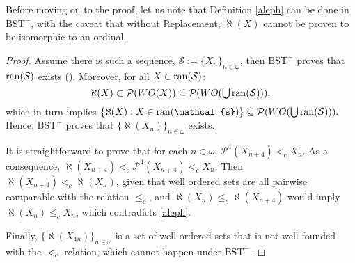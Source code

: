 \documentclass{article}
\begin{document}
Before moving on to the proof, let us note that Definition \ref{aleph} can be done in $\text{BST}^{-}$, with the caveat that without Replacement, $\aleph(X)$ cannot be proven to be isomorphic to an ordinal.
\begin{proof}
	Assume there is such a sequence, $\mathcal{S} := \{X_n\}_{n\in\omega}$, then $\text{BST}^{-}$ proves that $\operatorname{ran}(\mathcal{S})$ exists (\cite[Def. I.6.6]{Kunen}).
	Moreover, for all $X\in\operatorname{ran}(\mathcal{S})$: 
	\[
		\aleph(X) \subset \mathcal{P}(WO(X)) \subseteq \mathcal{P}(WO(\mathop{\textstyle\bigcup} \operatorname{ran}(\mathcal{S}))),
	\]
	which in turn implies $\{\aleph(X) : X\in\ran(\mathcal{s})\} \subseteq \mathcal{P}({WO(\union \ran(\mathcal{S}))}).$
	Hence, $\text{BST}^{-}$ proves that $\{\aleph(X_n)\}_{n\in\omega}$ exists.
	
	It is straightforward to prove that for each $n\in\omega$, $\mathcal{P}^{4}(X_{n+4}) <_c X_n$. 
	As a consequence, $\aleph(X_{n+4}) <_c \mathcal{P}^{4}(X_{n+4}) <_c X_n$.
	Then $\aleph(X_{n+4}) <_c \aleph(X_n)$, given that well ordered sets are all pairwise comparable with the relation $\leq_c$, and $\aleph(X_n) \leq_c \aleph(X_{n+4})$ would imply $\aleph(X_n) \leq_c X_n$, which contradicts \ref{aleph}.
	
	Finally, $\{\aleph(X_{4n})\}_{n\in\omega}$ is a set of well ordered sets that is not well founded with the $<_c$ relation, which cannot happen under $\text{BST}^{-}$.
\end{proof}






\printindex
\end{document}

